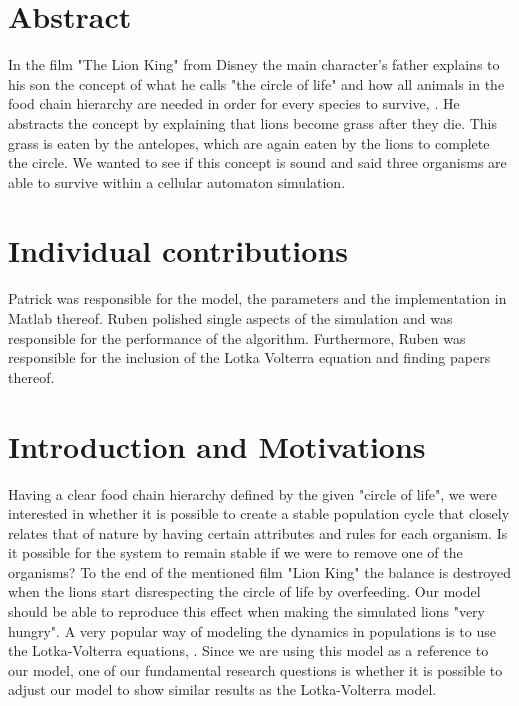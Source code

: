 \documentclass[11pt]{article}
\begin{document}

\tableofcontents

\newpage




\section{Abstract}
In the film "The Lion King" from Disney the main character's father explains to his son the concept of what he calls "the circle of life" and how all animals in the food chain hierarchy are needed in order for every species to survive, \cite{lionKing}. He abstracts the concept by explaining that lions become grass after they die. This grass is eaten by the antelopes, which are again eaten by the lions to complete the circle. We wanted to see if this concept is sound and said three organisms are able to survive within a cellular automaton simulation.

\section{Individual contributions}
Patrick was responsible for the model, the parameters and the implementation in Matlab thereof. Ruben polished single aspects of the simulation and was responsible for the performance of the algorithm. Furthermore, Ruben was responsible for the inclusion of the Lotka Volterra equation and finding papers thereof.

\section{Introduction and Motivations}
Having a clear food chain hierarchy defined by the given "circle of life", we were interested in whether it is possible to create a stable population cycle that closely relates that of nature by having certain attributes and rules for each organism. Is it possible for the system to remain stable if we were to remove one of the organisms? To the end of the mentioned film "Lion King" the balance is destroyed when the lions start disrespecting the circle of life by overfeeding. Our model should be able to reproduce this effect when making the simulated lions "very hungry".
A very popular way of modeling the dynamics in populations is to use the Lotka-Volterra equations, \cite{lotkaVolterra}. Since we are using this model as a reference to our model, one of our fundamental research questions is whether it is possible to adjust our model to show similar results as the Lotka-Volterra model.
\end{document}
